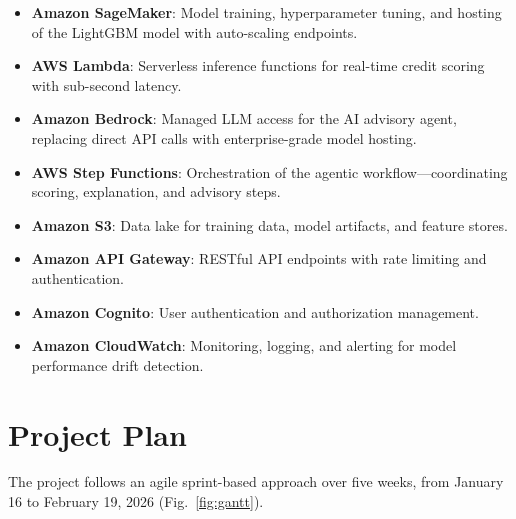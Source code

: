 \documentclass[12pt,a4paper]{article}
\begin{document}
\begin{itemize}
    \item \textbf{Amazon SageMaker}: Model training, hyperparameter tuning, and hosting of the LightGBM model with auto-scaling endpoints.
    \item \textbf{AWS Lambda}: Serverless inference functions for real-time credit scoring with sub-second latency.
    \item \textbf{Amazon Bedrock}: Managed LLM access for the AI advisory agent, replacing direct API calls with enterprise-grade model hosting.
    \item \textbf{AWS Step Functions}: Orchestration of the agentic workflow---coordinating scoring, explanation, and advisory steps.
    \item \textbf{Amazon S3}: Data lake for training data, model artifacts, and feature stores.
    \item \textbf{Amazon API Gateway}: RESTful API endpoints with rate limiting and authentication.
    \item \textbf{Amazon Cognito}: User authentication and authorization management.
    \item \textbf{Amazon CloudWatch}: Monitoring, logging, and alerting for model performance drift detection.
\end{itemize}

\section{Project Plan}

The project follows an agile sprint-based approach over five weeks, from January 16 to February 19, 2026 (Fig.~\ref{fig:gantt}).
\end{document}
